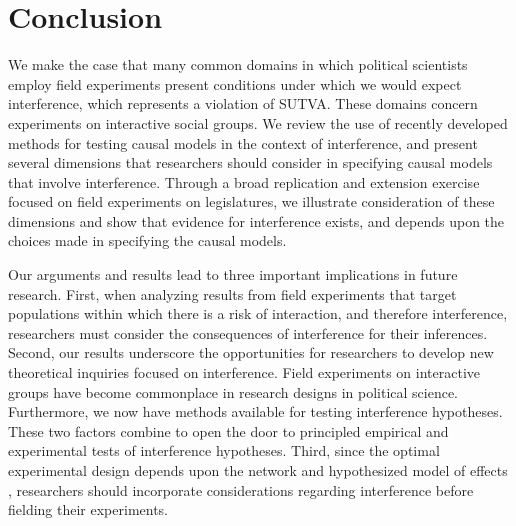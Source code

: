 \documentclass[12pt]{article}
\begin{document}
\section{Conclusion}


We make the case that many common domains in which political scientists employ field experiments present conditions under which we would expect interference, which represents a violation of SUTVA. These domains concern experiments on interactive social groups. We review the use of recently developed methods for testing causal models in the context of interference, and present several dimensions that researchers should consider in specifying causal models that involve interference. Through a broad replication and extension exercise focused on field experiments on legislatures, we illustrate consideration of these dimensions and show that evidence for interference exists, and depends upon the choices made in specifying the causal models.


Our arguments and results lead to three important implications in future research. First, when analyzing results from field experiments that target populations within which there is a risk of interaction, and therefore interference, researchers must consider the consequences of interference for their inferences. Second, our results underscore the opportunities for researchers to develop new theoretical inquiries focused on interference. Field experiments on interactive groups have become commonplace in research designs in political science. Furthermore, we now have methods available for testing interference hypotheses. These two factors combine to open the door to principled empirical and experimental tests of interference hypotheses. Third, since the optimal experimental design depends upon the network and hypothesized model of effects \citep{bowers2016models}, researchers should incorporate considerations regarding interference before fielding their experiments. %



\end{document}
